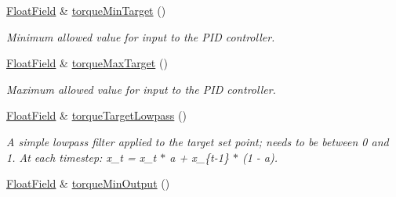 \begin{DoxyCompactItemize}
\mbox{\label{classhebi_1_1Command_1_1Settings_1_1Actuator_1_1TorqueGains_a3de5880860ddd81711b241d62efa76f4}} 
\hyperlink{classhebi_1_1Command_1_1FloatField}{Float\+Field} \& \hyperlink{classhebi_1_1Command_1_1Settings_1_1Actuator_1_1TorqueGains_a3de5880860ddd81711b241d62efa76f4}{torque\+Min\+Target} ()
\begin{DoxyCompactList}\small\item\em Minimum allowed value for input to the P\+ID controller. \end{DoxyCompactList}\item 
\mbox{\label{classhebi_1_1Command_1_1Settings_1_1Actuator_1_1TorqueGains_a28cffcd43a7f66008553806e9e15fbd2}} 
\hyperlink{classhebi_1_1Command_1_1FloatField}{Float\+Field} \& \hyperlink{classhebi_1_1Command_1_1Settings_1_1Actuator_1_1TorqueGains_a28cffcd43a7f66008553806e9e15fbd2}{torque\+Max\+Target} ()
\begin{DoxyCompactList}\small\item\em Maximum allowed value for input to the P\+ID controller. \end{DoxyCompactList}\item 
\mbox{\label{classhebi_1_1Command_1_1Settings_1_1Actuator_1_1TorqueGains_aa6e4bb44277c15e41db428125c785de9}} 
\hyperlink{classhebi_1_1Command_1_1FloatField}{Float\+Field} \& \hyperlink{classhebi_1_1Command_1_1Settings_1_1Actuator_1_1TorqueGains_aa6e4bb44277c15e41db428125c785de9}{torque\+Target\+Lowpass} ()
\begin{DoxyCompactList}\small\item\em A simple lowpass filter applied to the target set point; needs to be between 0 and 1. At each timestep\+: x\+\_\+t = x\+\_\+t $\ast$ a + x\+\_\+\{t-\/1\} $\ast$ (1 -\/ a). \end{DoxyCompactList}\item 
\mbox{\label{classhebi_1_1Command_1_1Settings_1_1Actuator_1_1TorqueGains_a22891ff90383ef13298ce8e059d7188a}} 
\hyperlink{classhebi_1_1Command_1_1FloatField}{Float\+Field} \& \hyperlink{classhebi_1_1Command_1_1Settings_1_1Actuator_1_1TorqueGains_a22891ff90383ef13298ce8e059d7188a}{torque\+Min\+Output} ()

\end{DoxyCompactItemize}
